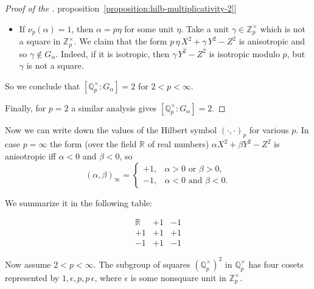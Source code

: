 \documentclass{article}
\newcommand{\ZZ}{\mathbb{Z}}
\newcommand{\QQ}{\mathbb{Q}}
\newcommand{\refref}[2]{\hyperref[#2]{#1~\ref*{#2}}}
\theoremstyle{myplain}
\theoremstyle{mydefinition}
\begin{document}
\begin{proof}[Proof of the \refref{proposition}{proposition:hilb-multiplicativity-2}]
\begin{itemize}
    If $ \nu_p (\alpha) = 0$, then the form $\alpha\,X^2 + p\,Y^2 - Z^2$ is
    anisotropic. Indeed, otherwise $\alpha X^2 - Z^2$ would be isotropic modulo
    $p$, but $\alpha$ is not a square modulo $p$. Thus $p \notin G_\alpha$.

  \item If $ \nu_p (\alpha) = 1$, then $\alpha = p \eta$ for some unit
    $\eta$. Take a unit $\gamma \in \ZZ_p^\times$ which is not a square in
    $\ZZ_p^\times$. We claim that the form $p\,\eta\,X^2 + \gamma\,Y^2 - Z^2$ is
    anisotropic and so $\gamma \notin G_\alpha$. Indeed, if it is isotropic,
    then $\gamma\,Y^2 - Z^2$ is isotropic modulo $p$, but $\gamma$ is not a
    square.
  \end{itemize}

  So we conclude that $[\QQ_p^\times : G_\alpha] = 2$ for $2 < p < \infty$.

  Finally, for $p = 2$ a similar analysis gives $[\QQ_p^\times : G_\alpha] = 2$.
\end{proof}

Now we can write down the values of the Hilbert symbol $(\cdot,\cdot)_p$ for
various $p$. In case $p = \infty$ the form (over the field $\mathbb{R}$ of real
numbers) $\alpha X^2 + \beta Y^2 - Z^2$ is anisotropic iff $\alpha < 0$ and
$\beta < 0$, so
\[ (\alpha,\beta)_\infty =
  \left\{\begin{array}{ll}
           +1, & \alpha > 0 \text{ or } \beta > 0,\\
           -1, & \alpha < 0 \text{ and } \beta < 0.
         \end{array}\right. \]

We summarize it in the following table:

\[ \begin{array}{c|cc}
     \mathbb{R} & +1 & -1 \\
     \hline
     +1 & +1 & +1 \\
     -1 & +1 & -1
   \end{array} \]

Now assume $2 < p < \infty$. The subgroup of squares $(\QQ_p^\times)^2$ in
$\QQ_p^\times$ has four cosets represented by $1, \epsilon, p, p\,\epsilon$,
where $\epsilon$ is some nonsquare unit in $\ZZ_p^\times$.
\end{document}
